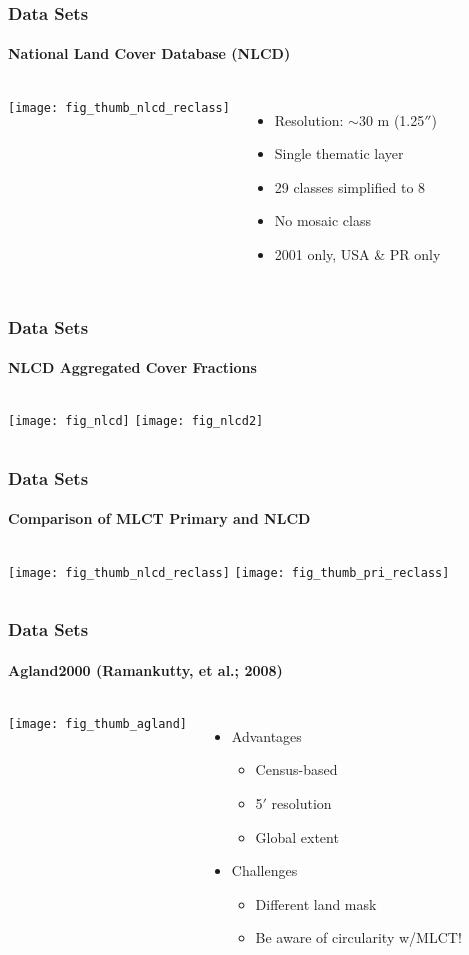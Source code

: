 \documentclass{beamer}
\begin{document}
\begin{frame}
  \frametitle{Data Sets}
  \framesubtitle{National Land Cover Database (NLCD)}
  \begin{columns}
    \column{2.5in}
    \texttt{[image: fig\_thumb\_nlcd\_reclass]}    
    \column{2.5in}
    \begin{itemize}
    \item Resolution: $\sim$30 m (1.25$''$)
      \pause
    \item Single thematic layer
      \pause
    \item 29 classes simplified to 8
      \pause
    \item No mosaic class
      \pause
    \item 2001 only, USA \& PR only
    \end{itemize}
  \end{columns}
\end{frame}

\begin{frame}
  \frametitle{Data Sets}
  \framesubtitle{NLCD Aggregated Cover Fractions}
  \begin{columns}
    \column{2.5in}
    \centering
    \texttt{[image: fig\_nlcd]}
    \column{2.5in}
    \texttt{[image: fig\_nlcd2]}
  \end{columns}
\end{frame}

\begin{frame}
  \frametitle{Data Sets}
  \framesubtitle{Comparison of MLCT Primary and NLCD}
  \begin{columns}
    \column{2.5in}
    \texttt{[image: fig\_thumb\_nlcd\_reclass]}    
    \column{2.5in}
    \texttt{[image: fig\_thumb\_pri\_reclass]}    
  \end{columns}
\end{frame}


\begin{frame}
  \frametitle{Data Sets}
  \framesubtitle{Agland2000 (Ramankutty, et al.; 2008)}
  \begin{columns}
    \column{2.5in}
    \texttt{[image: fig\_thumb\_agland]}    
    \column{2.5in}
    \begin{itemize}
    \item Advantages
      \begin{itemize}
        \pause
      \item Census-based
        \pause
      \item 5$'$ resolution
        \pause
      \item Global extent
      \end{itemize}
      \pause
    \item Challenges
      \begin{itemize}
        \pause
      \item Different land mask
        \pause
      \item Be aware of circularity w\slash{}MLCT!
      \end{itemize}
    \end{itemize}
  \end{columns}
\end{frame}
\end{document}
